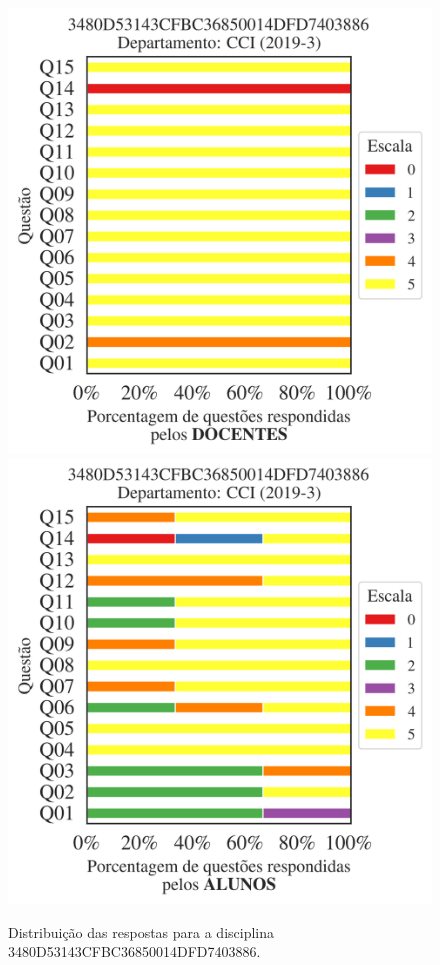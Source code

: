\documentclass[a4paper,10pt]{article}
\begin{document}
\begin{figure}[h]
\centering
\includegraphics[width=0.485\linewidth]{analise_disciplina_departamento_CCI_3480D53143CFBC36850014DFD7403886_docentes.png}
\includegraphics[width=0.485\linewidth]{analise_disciplina_departamento_CCI_3480D53143CFBC36850014DFD7403886_alunos.png}
\caption{\label{fig:analise_geral_departamento}                Distribuição das respostas para a disciplina 3480D53143CFBC36850014DFD7403886. }
\end{figure}
\end{document}
